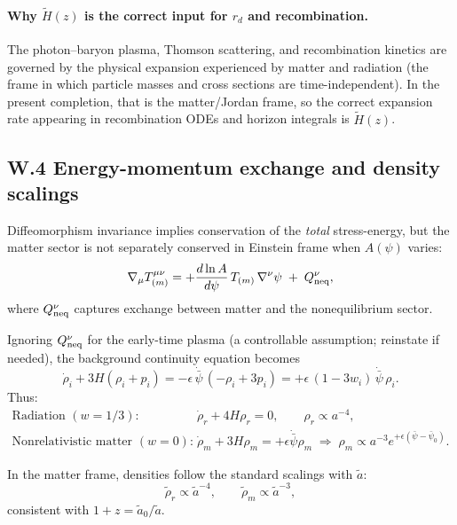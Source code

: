 \documentclass[10pt]{article}
\begin{document}
\paragraph{Why $\tilde H(z)$ is the correct input for $r_d$ and recombination.}
The photon--baryon plasma, Thomson scattering, and recombination kinetics are governed by the
physical expansion experienced by matter and radiation (the frame in which particle masses and
cross sections are time-independent). In the present completion, that is the matter/Jordan frame,
so the correct expansion rate appearing in recombination ODEs and horizon integrals is $\tilde H(z)$.

\subsection{W.4 Energy-momentum exchange and density scalings}
\label{app:early_universe:exchange}

Diffeomorphism invariance implies conservation of the \emph{total} stress-energy, but the matter
sector is not separately conserved in Einstein frame when $A(\psi)$ varies:
\begin{equation}
\nabla_\mu T_{(m)}^{\mu\nu}
=
+\frac{d\ln A}{d\psi}\,T_{(m)}\,\nabla^\nu\psi
\;+\;Q^\nu_{\rm neq},
\label{eq:W_exchange_general}
\end{equation}
where $Q^\nu_{\rm neq}$ captures exchange between matter and the nonequilibrium sector.

Ignoring $Q^\nu_{\rm neq}$ for the early-time plasma (a controllable assumption; reinstate if needed),
the background continuity equation becomes
\begin{equation}
\dot\rho_i + 3H(\rho_i+p_i)
=
-\epsilon\,\dot{\bar\psi}\,(-\rho_i+3p_i)
=
+\epsilon\,(1-3w_i)\,\dot{\bar\psi}\,\rho_i.
\label{eq:W_rho_exchange}
\end{equation}
Thus:
\begin{align}
\text{Radiation }(w=1/3):\quad &\dot\rho_r + 4H\rho_r = 0,\qquad \rho_r\propto a^{-4},
\label{eq:W_rho_rad}\\
\text{Nonrelativistic matter }(w=0):\quad &\dot\rho_m + 3H\rho_m = +\epsilon\dot{\bar\psi}\rho_m
\;\Rightarrow\;
\rho_m \propto a^{-3}e^{+\epsilon(\bar\psi-\bar\psi_0)}.
\label{eq:W_rho_m}
\end{align}

In the matter frame, densities follow the standard scalings with $\tilde a$:
\begin{equation}
\tilde\rho_r \propto \tilde a^{-4},\qquad \tilde\rho_m \propto \tilde a^{-3},
\label{eq:W_tilde_scalings}
\end{equation}
consistent with $1+z=\tilde a_0/\tilde a$.
\end{document}
